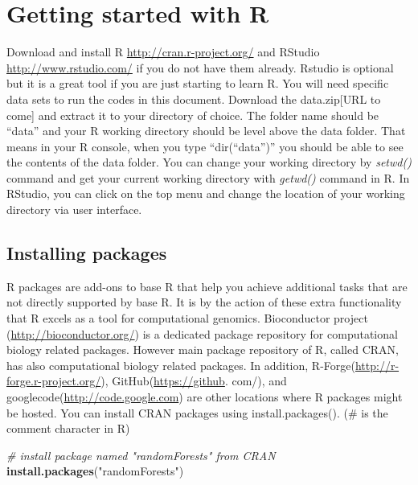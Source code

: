 \documentclass[12pt,]{krantz}
\newenvironment{Shaded}{\begin{snugshade}}{\end{snugshade}}
\newcommand{\CommentTok}[1]{\textcolor[rgb]{0.56,0.35,0.01}{\textit{#1}}}
\newcommand{\KeywordTok}[1]{\textcolor[rgb]{0.13,0.29,0.53}{\textbf{#1}}}
\newcommand{\NormalTok}[1]{#1}
\newcommand{\StringTok}[1]{\textcolor[rgb]{0.31,0.60,0.02}{#1}}
\theoremstyle{definition}
\theoremstyle{definition}
\theoremstyle{definition}
\theoremstyle{remark}
\begin{document}
\hypertarget{getting-started-with-r}{%
\section{Getting started with R}\label{getting-started-with-r}}

Download and install R \url{http://cran.r-project.org/} and RStudio
\url{http://www.rstudio.com/} if you do not have them already. Rstudio
is optional but it is a great tool if you are just starting to learn R.
You will need specific data sets to run the codes in this document.
Download the data.zip{[}URL to come{]} and extract it to your directory
of choice. The folder name should be ``data'' and your R working
directory should be level above the data folder. That means in your R
console, when you type ``dir(``data'')'' you should be able to see the
contents of the data folder. You can change your working directory by
\emph{setwd()} command and get your current working directory with
\emph{getwd()} command in R. In RStudio, you can click on the top menu
and change the location of your working directory via user interface.

\hypertarget{installing-packages}{%
\subsection{Installing packages}\label{installing-packages}}

R packages are add-ons to base R that help you achieve additional tasks
that are not directly supported by base R. It is by the action of these
extra functionality that R excels as a tool for computational genomics.
Bioconductor project (\url{http://bioconductor.org/}) is a dedicated
package repository for computational biology related packages. However
main package repository of R, called CRAN, has also computational
biology related packages. In addition,
R-Forge(\url{http://r-forge.r-project.org/}),
GitHub(\url{https://github}. com/), and
googlecode(\url{http://code.google.com}) are other locations where R
packages might be hosted. You can install CRAN packages using
install.packages(). (\# is the comment character in R)

\begin{Shaded}
\begin{Highlighting}[]
\CommentTok{# install package named "randomForests" from CRAN}
\KeywordTok{install.packages}\NormalTok{(}\StringTok{"randomForests"}\NormalTok{)}
\end{Highlighting}
\end{Shaded}
\end{document}

